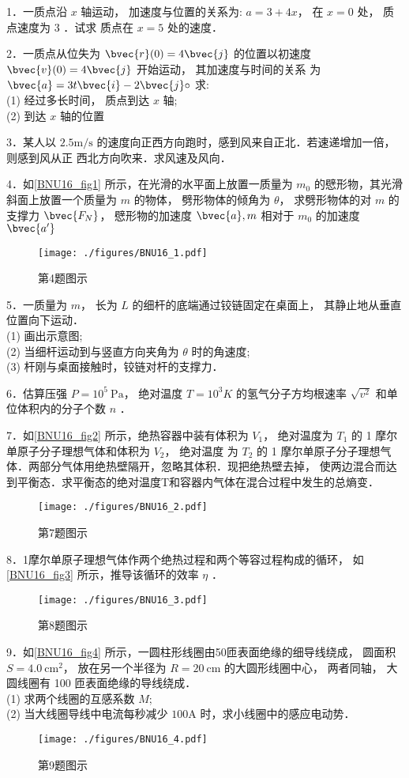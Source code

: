 
1．一质点沿 $x$ 轴运动， 加速度与位置的关系为: $a=3+4 x$， 在 $x=0$ 处， 质点速度为 3 ．试求 质点在 $x=5$ 处的速度．

2．一质点从位失为 $\bvec{r}(0)=4 \bvec{j}$ 的位置以初速度 $\bvec{v}(0)=4 \bvec{j}$ 开始运动， 其加速度与时间的关系 为 $\bvec{a}=3 t \bvec{i}-2 \bvec{j} \circ$ 求:\\
(1) 经过多长时间， 质点到达 $x$ 轴;\\
(2) 到达 $x$ 轴的位置

3．某人以 $2.5 \mathrm{m / s}$ 的速度向正西方向跑时，感到风来自正北．若速递增加一倍， 则感到风从正 西北方向吹来．求风速及风向．

4．如\autoref{BNU16_fig1} 所示，在光滑的水平面上放置一质量为 $m_{0}$ 的憵形物，其光滑斜面上放置一个质量为 $m$ 的物体， 劈形物体的倾角为 $\theta$， 求劈形物体的对 $m$ 的支撑力 $\bvec{F_{N}}$， 憵形物的加速度 $\bvec{a}, m$ 相对于 $m_{0}$ 的加速度 $\bvec{a^{\prime}}$
\begin{figure}[ht]
\centering
\texttt{[image: ./figures/BNU16\_1.pdf]}
\caption{第4题图示} \label{BNU16_fig1}
\end{figure}
5．一质量为 $m$， 长为 $L$ 的细杆的底端通过铰链固定在桌面上， 其静止地从垂直位置向下运动．\\
(1) 画出示意图;\\
(2) 当细杆运动到与竖直方向夹角为 $\theta$ 时的角速度;\\
(3) 杆刚与桌面接触时，铰链对杆的支撑力．

6．估算压强 $P=10^{5} \mathrm{~Pa}$， 绝对温度 $T=10^{3} K$ 的氢气分子方均根速率 $\sqrt{v^{2}}$ 和单位体积内的分子个数 $n$ ．

7．如\autoref{BNU16_fig2} 所示，绝热容器中装有体积为 $V_{1}$， 绝对温度为 $T_{1}$ 的 1 摩尔单原子分子理想气体和体积为 $V_{2}$， 绝对温度 为 $T_{2}$ 的 1 摩尔单原子分子理想气体．两部分气体用绝热壁隔开，忽略其体积．现把绝热壁去掉， 使两边混合而达到平衡态．求平衡态的绝对温度T和容器内气体在混合过程中发生的总熵变．
\begin{figure}[ht]
\centering
\texttt{[image: ./figures/BNU16\_2.pdf]}
\caption{第7题图示} \label{BNU16_fig2}
\end{figure}
8．1摩尔单原子理想气体作两个绝热过程和两个等容过程构成的循环， 如\autoref{BNU16_fig3} 所示，推导该循环的效率 $\eta$ ．
\begin{figure}[ht]
\centering
\texttt{[image: ./figures/BNU16\_3.pdf]}
\caption{第8题图示} \label{BNU16_fig3}
\end{figure}
9．如\autoref{BNU16_fig4} 所示，一圆柱形线圈由50匝表面绝缘的细导线绕成， 圆面积 $S=4.0 \mathrm{~cm}^{2}$， 放在另一个半径为 $R=20 \mathrm{~cm}$ 的大圆形线圈中心， 两者同轴， 大圆线圈有 100 匝表面绝缘的导线绕成．\\
(1) 求两个线圈的互感系数 $M$;\\
(2) 当大线圈导线中电流每秒减少 $100\mathrm{A}$ 时，求小线圈中的感应电动势．
\begin{figure}[ht]
\centering
\texttt{[image: ./figures/BNU16\_4.pdf]}
\caption{第9题图示} \label{BNU16_fig4}
\end{figure}

